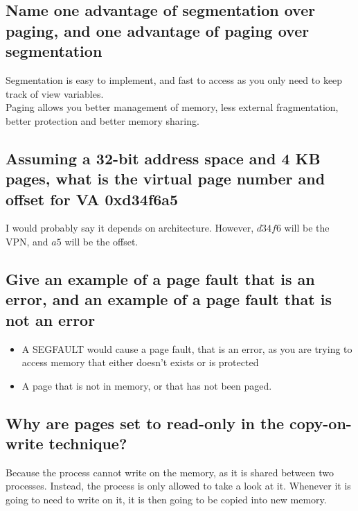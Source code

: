 \documentclass[a4paper]{article}
\begin{document}
\subsection{Name one advantage of segmentation over paging, and one advantage of paging over segmentation} %
\label{sub:Name one advangate of egmentation over paging, and one advantage of paging over segmentation}
Segmentation is easy to implement, and fast to access as you only need to keep track of view variables. \\
Paging allows you better management of memory, less external fragmentation, better protection and better memory sharing.
\subsection{Assuming a 32-bit address space and 4 KB pages, what is the virtual page number and offset for VA 0xd34f6a5} %
\label{sub:Assuming a 32-bit address space and 4 KB pages, what is the virtual page number and offset for VA 0xd34f6a5}
I would probably say it depends on architecture. However, $d34f6$ will be the VPN, and $a5$ will be the offset.
\subsection{Give an example of a page fault that is an error, and an example of a page fault that is not an error} %
\label{sub:Give an example of a page fault that is an error, and an example of a page fault that is not an error}
\begin{itemize}
  \item A SEGFAULT would cause a page fault, that is an error, as you are trying to access memory that either doesn't exists or
    is protected
  \item A page that is not in memory, or that has not been paged.
\end{itemize}
\subsection{Why are pages set to read-only in the copy-on-write technique?} %
\label{sub:Why are pages set to read-only in the copy-on-write technique?}
Because the process cannot write on the memory, as it is shared between two processes. Instead, the process is only allowed to take
a look at it. Whenever it is going to need to write on it, it is then going to be copied into new memory.
\end{document}
